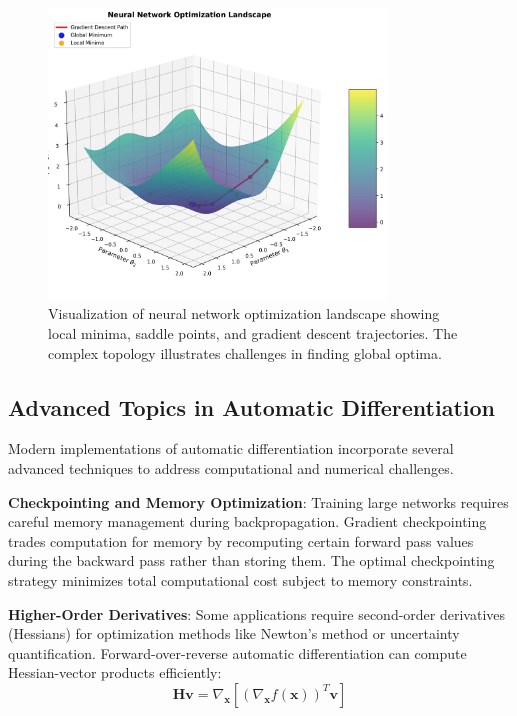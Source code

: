 \documentclass[11pt,a4paper]{report}
\begin{document}
\begin{figure}[H]
\centering
\includegraphics[width=0.8\textwidth]{optimization_landscape.png}
\caption{Visualization of neural network optimization landscape showing local minima, saddle points, and gradient descent trajectories. The complex topology illustrates challenges in finding global optima.}
\label{fig:optimization_landscape}
\end{figure}

\subsection{Advanced Topics in Automatic Differentiation}

Modern implementations of automatic differentiation incorporate several advanced techniques to address computational and numerical challenges.

\textbf{Checkpointing and Memory Optimization}: Training large networks requires careful memory management during backpropagation. Gradient checkpointing trades computation for memory by recomputing certain forward pass values during the backward pass rather than storing them. The optimal checkpointing strategy minimizes total computational cost subject to memory constraints.

\textbf{Higher-Order Derivatives}: Some applications require second-order derivatives (Hessians) for optimization methods like Newton's method or uncertainty quantification. Forward-over-reverse automatic differentiation can compute Hessian-vector products efficiently:
\begin{equation}
\mathbf{H}\mathbf{v} = \nabla_{\mathbf{x}} [(\nabla_{\mathbf{x}} f(\mathbf{x}))^T \mathbf{v}]
\end{equation}
\end{document}
